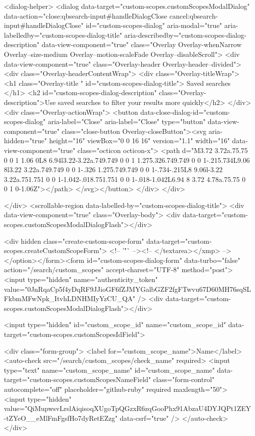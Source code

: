<dialog-helper>
  <dialog data-target="custom-scopes.customScopesModalDialog" data-action="close:qbsearch-input#handleDialogClose cancel:qbsearch-input#handleDialogClose" id="custom-scopes-dialog" aria-modal="true" aria-labelledby="custom-scopes-dialog-title" aria-describedby="custom-scopes-dialog-description" data-view-component="true" class="Overlay Overlay-whenNarrow Overlay--size-medium Overlay--motion-scaleFade Overlay--disableScroll">
    <div data-view-component="true" class="Overlay-header Overlay-header--divided">
  <div class="Overlay-headerContentWrap">
    <div class="Overlay-titleWrap">
      <h1 class="Overlay-title " id="custom-scopes-dialog-title">
        Saved searches
      </h1>
        <h2 id="custom-scopes-dialog-description" class="Overlay-description">Use saved searches to filter your results more quickly</h2>
    </div>
    <div class="Overlay-actionWrap">
      <button data-close-dialog-id="custom-scopes-dialog" aria-label="Close" aria-label="Close" type="button" data-view-component="true" class="close-button Overlay-closeButton"><svg aria-hidden="true" height="16" viewBox="0 0 16 16" version="1.1" width="16" data-view-component="true" class="octicon octicon-x">
    <path d="M3.72 3.72a.75.75 0 0 1 1.06 0L8 6.94l3.22-3.22a.749.749 0 0 1 1.275.326.749.749 0 0 1-.215.734L9.06 8l3.22 3.22a.749.749 0 0 1-.326 1.275.749.749 0 0 1-.734-.215L8 9.06l-3.22 3.22a.751.751 0 0 1-1.042-.018.751.751 0 0 1-.018-1.042L6.94 8 3.72 4.78a.75.75 0 0 1 0-1.06Z"></path>
</svg></button>
    </div>
  </div>
  
</div>
      <scrollable-region data-labelled-by="custom-scopes-dialog-title">
        <div data-view-component="true" class="Overlay-body">        <div data-target="custom-scopes.customScopesModalDialogFlash"></div>

        <div hidden class="create-custom-scope-form" data-target="custom-scopes.createCustomScopeForm">
        <!-- '"` --><!-- </textarea></xmp> --></option></form><form id="custom-scopes-dialog-form" data-turbo="false" action="/search/custom_scopes" accept-charset="UTF-8" method="post"><input type="hidden" name="authenticity_token" value="0JnRqaCp5f4yDqRF9JJioGF6fZJMYGalbGZF2fgFTwvu67D60MH76sqSLFkbmMFwNpk_ItvhLDNHMIyYzCU_QA" />
          <div data-target="custom-scopes.customScopesModalDialogFlash"></div>

          <input type="hidden" id="custom_scope_id" name="custom_scope_id" data-target="custom-scopes.customScopesIdField">

          <div class="form-group">
            <label for="custom_scope_name">Name</label>
            <auto-check src="/search/custom_scopes/check_name" required>
              <input
                type="text"
                name="custom_scope_name"
                id="custom_scope_name"
                data-target="custom-scopes.customScopesNameField"
                class="form-control"
                autocomplete="off"
                placeholder="github-ruby"
                required
                maxlength="50">
              <input type="hidden" value="QiMupwsvLrslAiqisoqXUgoTpQGzxR6zqGooPhx91AbzaU4DYJQPt1ZEY-tZYeO__eMlFmFgsfHo7dyRetEZzg" data-csrf="true" />
            </auto-check>
          </div>

